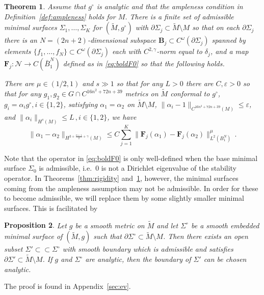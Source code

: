 \documentclass[11pt]{amsart}
\newtheorem{Theorem}{Theorem}[section]
\newtheorem{Proposition}[Theorem]{Proposition}
\theoremstyle{definition}
\numberwithin{equation}{section}
\newcommand{\norm}[1]{\lVert #1 \rVert}         %
\newcommand{\eps}{\varepsilon}
\newcommand{\p}{\partial}
\begin{document}
\begin{Theorem}\label{thm:stability}
	Assume that $g^\circ$ is analytic and that the ampleness condition in Definition~\ref{def:ampleness} holds for $M$. There is a finite set of admissible minimal surfaces $\Sigma_1,\dots,\Sigma_K$ for $(\widetilde{M},g^\circ)$ with $\p\Sigma_j\subset \widetilde{M}\setminus M$ so that on each $\p\Sigma_j$ there is an $N=(2n+2)$-dimensional subspace $\mathbf{B}_j \subset C^\omega(\partial\Sigma_j)$ spanned by elements $\{f_1,\dots, f_{N}\} \subset C^\omega(\partial\Sigma_j)$ each with $C^{2,\gamma}$-norm equal to $\delta_j$, and a map $\mathbf{F}_j\colon \mathcal N \to C(\bar B_1^{N})$ defined as in \eqref{eq:boldF0} so that the following holds.


	


	There are $\mu \in (1/2,1)$ and $s \gg 1$ so that for any $L>0$ there are $C,\eps >0$ so that for any  $g_1,g_2 \in G\cap C^{16n^2+72n+39}$ metrics on $\widetilde{M}$ conformal to $g^\circ$, $g_i = \alpha_i g^\circ, i\in\{1,2\}$, satisfying $\alpha_1=\alpha_2$ on $\widetilde{M}\setminus M$, $\norm{\alpha_i - 1}_{C^{16n^2+72n+39}(M)} \leq \eps$, %
	and $\norm{\alpha_i}_{H^s(M)} \leq L\,,i\in\{1,2\}$, we have
	\[
		\norm{\alpha_1-\alpha_2}_{H^{3+\frac{n+1}{2}+\gamma}(M)}\leq C\sum_{j=1}^K\norm{\mathbf{F}_j(\alpha_1)-\mathbf{F}_j(\alpha_2)}^\mu_{L^2(B_1^{N})}\,.
	\]
\end{Theorem}



Note that the operator in \eqref{eq:boldF0} is only well-defined when the base minimal surface $\Sigma_0$ is admissible, i.e.\ $0$ is not a Dirichlet eigenvalue of the stability operator. In Theorems~\ref{thm:rigidity} and~\ref{thm:stability}, however, the minimal surfaces coming from the ampleness assumption may not be admissible. In order for these to become admissible, we will replace them by some slightly smaller minimal surfaces. This is facilitated by 
\begin{Proposition}\label{prop:makeadmissible}
    Let $g$ be a smooth metric on $\widetilde{M}$ and let $\Sigma^\circ$ be a smooth embedded minimal surface of $(\widetilde{M},g)$ 
    such that $\partial \Sigma^\circ \subset \widetilde{M}\setminus M$. Then there exists an open subset $\Sigma' \subset\subset \Sigma^\circ$ with smooth boundary which is admissible and satisfies $\partial \Sigma' \subset \widetilde{M}\setminus M$. If $g$ and $\Sigma^\circ$ are analytic, then the boundary of $\Sigma'$ can be chosen analytic.
    
    

\end{Proposition}
The proof is found in Appendix~\ref{sec:ev}. 
\end{document}

